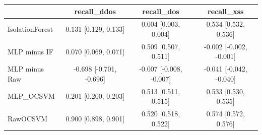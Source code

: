 \begin{tabular}{lccc}
\toprule
 & recall\_ddos & recall\_dos & recall\_xss \\
\midrule
IsolationForest & 0.131 [0.129, 0.133] & 0.004 [0.003, 0.004] & 0.534 [0.532, 0.536] \\
MLP minus IF & 0.070 [0.069, 0.071] & 0.509 [0.507, 0.511] & -0.002 [-0.002, -0.001] \\
MLP minus Raw & -0.698 [-0.701, -0.696] & -0.007 [-0.008, -0.007] & -0.041 [-0.042, -0.040] \\
MLP\_OCSVM & 0.201 [0.200, 0.203] & 0.513 [0.511, 0.515] & 0.533 [0.530, 0.535] \\
RawOCSVM & 0.900 [0.898, 0.901] & 0.520 [0.518, 0.522] & 0.574 [0.572, 0.576] \\
\bottomrule
\end{tabular}